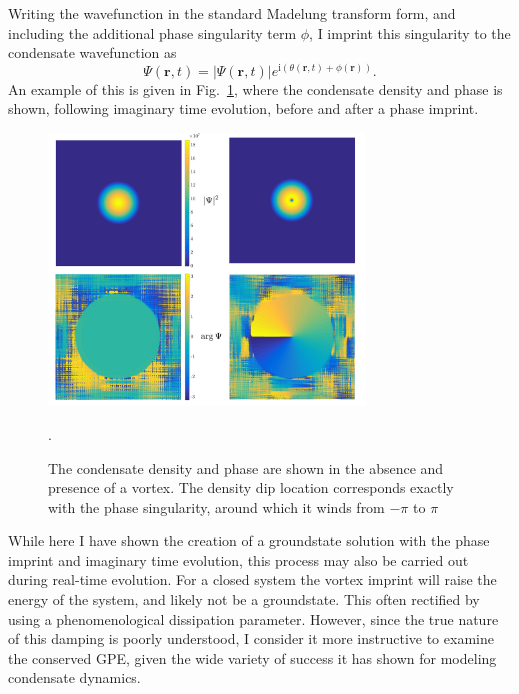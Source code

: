 Writing the wavefunction in the standard Madelung transform form, and including the additional phase singularity term $\phi$, I imprint this singularity to the condensate wavefunction as
\begin{equation}
    \Psi(\mathbf{r},t) = |\Psi(\mathbf{r},t)|e^{\text{i}(\theta(\mathbf{r},t) + \phi(\mathbf{r}))}.
\end{equation}
An example of this is given in Fig.~\ref{fig:0to1vtx}, where the condensate density and phase is shown, following imaginary time evolution, before and after a phase imprint.

\begin{figure}\centering
    \includegraphics[width=0.75\textwidth]{Images/ch4_vtx/1vtxbec.pdf}
    \caption{The condensate density and phase are shown in the absence and presence of a vortex. The density dip location corresponds exactly with the phase singularity, around which it winds from $-\pi$ to $\pi$}.\label{fig:0to1vtx}
\end{figure}
While here I have shown the creation of a groundstate solution with the phase imprint and imaginary time evolution, this process may also be carried out during real-time evolution. For a closed system the vortex imprint will raise the energy of the system, and likely not be a groundstate. This often rectified by using a phenomenological dissipation parameter. However, since the true nature of this damping is poorly understood, I consider it more instructive to examine the conserved GPE, given the wide variety of success it has shown for modeling condensate dynamics.

